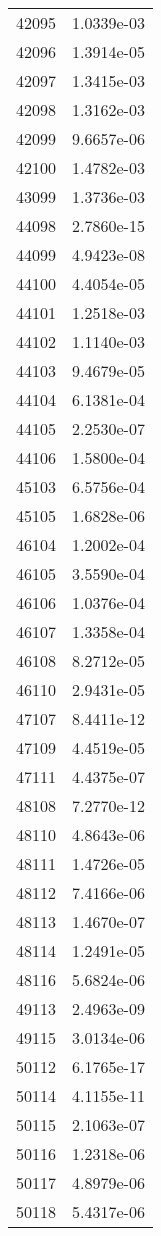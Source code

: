 \begin{table}[h!]
\begin{tabular}{|| c || c |}
42095 & 1.0339e-03 \\
42096 & 1.3914e-05 \\
42097 & 1.3415e-03 \\
42098 & 1.3162e-03 \\
42099 & 9.6657e-06 \\
42100 & 1.4782e-03 \\
43099 & 1.3736e-03 \\
44098 & 2.7860e-15 \\
44099 & 4.9423e-08 \\
44100 & 4.4054e-05 \\
44101 & 1.2518e-03 \\
44102 & 1.1140e-03 \\
44103 & 9.4679e-05 \\
44104 & 6.1381e-04 \\
44105 & 2.2530e-07 \\
44106 & 1.5800e-04 \\
45103 & 6.5756e-04 \\
45105 & 1.6828e-06 \\
46104 & 1.2002e-04 \\
46105 & 3.5590e-04 \\
46106 & 1.0376e-04 \\
46107 & 1.3358e-04 \\
46108 & 8.2712e-05 \\
46110 & 2.9431e-05 \\
47107 & 8.4411e-12 \\
47109 & 4.4519e-05 \\
47111 & 4.4375e-07 \\
48108 & 7.2770e-12 \\
48110 & 4.8643e-06 \\
48111 & 1.4726e-05 \\
48112 & 7.4166e-06 \\
48113 & 1.4670e-07 \\
48114 & 1.2491e-05 \\
48116 & 5.6824e-06 \\
49113 & 2.4963e-09 \\
49115 & 3.0134e-06 \\
50112 & 6.1765e-17 \\
50114 & 4.1155e-11 \\
50115 & 2.1063e-07 \\
50116 & 1.2318e-06 \\
50117 & 4.8979e-06 \\
50118 & 5.4317e-06 \\

\end{tabular}
\end{table}
